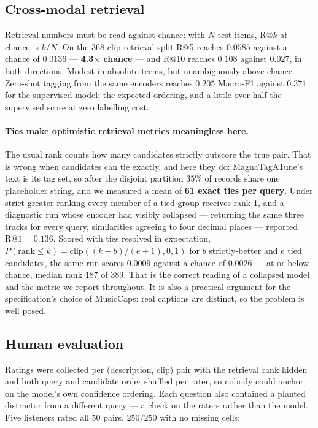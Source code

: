 \documentclass[10pt]{article}
\begin{document}
\subsection{Cross-modal retrieval}
\label{sec:retrieval}



Retrieval numbers must be read against chance: with $N$ test items, R@$k$ at
chance is $k/N$. On the $368$-clip retrieval split R@5 reaches $0.0585$ against
a chance of $0.0136$ --- \textbf{4.3$\times$ chance} --- and R@10 reaches $0.108$
against $0.027$, in both directions. Modest in absolute terms, but unambiguously
above chance. Zero-shot tagging from the same encoders reaches $0.205$ Macro-F1
against $0.371$ for the supervised model: the expected ordering, and a little
over half the supervised score at zero labelling cost.

\paragraph{Ties make optimistic retrieval metrics meaningless here.} The usual
rank counts how many candidates strictly outscore the true pair. That is wrong
when candidates can tie exactly, and here they do: MagnaTagATune's text is its
tag set, so after the disjoint partition $35\%$ of records share one placeholder
string, and we measured a mean of \textbf{61 exact ties per query}. Under
strict-greater ranking every member of a tied group receives rank 1, and a
diagnostic run whose encoder had visibly collapsed --- returning the same three
tracks for every query, similarities agreeing to four decimal places ---
reported $\text{R@}1 = 0.136$. Scored with ties resolved in expectation,
$P(\text{rank} \le k) = \mathrm{clip}((k-b)/(e+1), 0, 1)$ for $b$
strictly-better and $e$ tied candidates, the same run scores $0.0009$ against a
chance of $0.0026$ --- at or below chance, median rank 187 of 389. That is the
correct reading of a collapsed model and the metric we report throughout. It is
also a practical argument for the specification's choice of MusicCaps: real
captions are distinct, so the problem is well posed.

\subsection{Human evaluation}
\label{sec:human}



Ratings were collected per (description, clip) pair with the retrieval rank
hidden and both query and candidate order shuffled per rater, so nobody could
anchor on the model's own confidence ordering. Each question also contained a
planted distractor from a different query --- a check on the raters rather than
the model. Five listeners rated all 50 pairs, $250/250$ with no missing cells:
\end{document}
